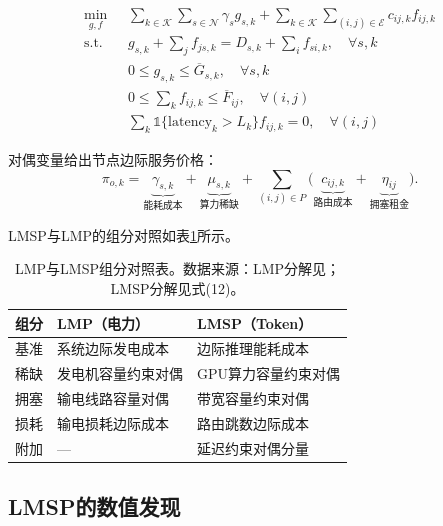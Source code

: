 \documentclass[11pt,twocolumn]{article}
\begin{document}
\begin{align}
\min_{g, f} \; & \sum_{k \in \mathcal{K}} \sum_{s \in \mathcal{N}} \gamma_s g_{s,k} + \sum_{k \in \mathcal{K}} \sum_{(i,j) \in \mathcal{E}} c_{ij,k} f_{ij,k} \label{eq:lp}\\
\text{s.t.} \quad & g_{s,k} + \sum_{j} f_{js,k} = D_{s,k} + \sum_{i} f_{si,k}, \quad \forall s, k \label{eq:flow}\\
& 0 \leq g_{s,k} \leq \overline{G}_{s,k}, \quad \forall s, k \label{eq:gencap}\\
& 0 \leq \sum_{k} f_{ij,k} \leq \overline{F}_{ij}, \quad \forall (i,j) \label{eq:linecap}\\
& \sum_{k} \mathbb{1}\{\text{latency}_k > L_k\} f_{ij,k} = 0, \quad \forall (i,j) \label{eq:latency}
\end{align}

对偶变量给出节点边际服务价格：
\begin{equation}
\pi_{o,k} = \underbrace{\gamma_{s,k}}_{\text{能耗成本}} + \underbrace{\mu_{s,k}}_{\text{算力稀缺}} + \sum_{(i,j) \in P} \bigl(\underbrace{c_{ij,k}}_{\text{路由成本}} + \underbrace{\eta_{ij}}_{\text{拥塞租金}}\bigr).
\label{eq:lmsp}
\end{equation}

LMSP与LMP的组分对照如表\ref{tab:lmp_lmsp}所示。

\begin{table}[htbp]
\centering
\caption{LMP与LMSP组分对照表。数据来源：LMP分解见\cite{schweppe1988spot,hogan1992contract}；LMSP分解见\cite{liu2026locational}式(12)。}
\label{tab:lmp_lmsp}
\begin{tabular}{p{1.5cm}p{2.5cm}p{2.5cm}}
\toprule
\textbf{组分} & \textbf{LMP（电力）} & \textbf{LMSP（Token）} \\
\midrule
基准 & 系统边际发电成本 & 边际推理能耗成本 \\
稀缺 & 发电机容量约束对偶 & GPU算力容量约束对偶 \\
拥塞 & 输电线路容量对偶 & 带宽容量约束对偶 \\
损耗 & 输电损耗边际成本 & 路由跳数边际成本 \\
附加 & — & 延迟约束对偶分量 \\
\bottomrule
\end{tabular}
\end{table}

\subsection{LMSP的数值发现}
\end{document}
